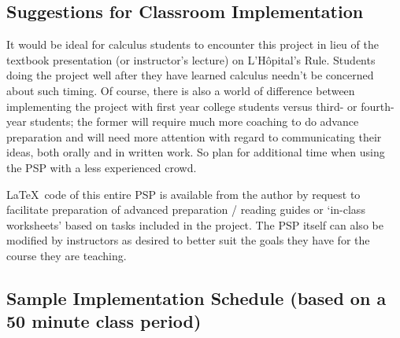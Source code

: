\documentclass[11pt]{article}
\begin{document}
  \vspace*{-6pt}
\subsection*{Suggestions for Classroom Implementation}
  \vspace*{-3pt}

It would be ideal for calculus students to encounter this project in lieu of the textbook presentation (or instructor's lecture) on L'H\^opital's Rule. Students doing the project well after they have learned calculus needn't be concerned about such timing. Of course, there is also a world of difference between implementing the project with first year college students versus third- or fourth-year students; the former will require much more coaching to do advance preparation and will need more attention with regard to communicating their ideas, both orally and in written work. So plan for additional time when using the PSP with a less experienced crowd.


\LaTeX \, code of this entire PSP is available from the author by request to facilitate preparation of  advanced preparation / reading guides or  `in-class worksheets' based on tasks included in the project.   The PSP itself can also be modified by  instructors as desired to better suit the  goals they have for the  course they are teaching.




  \vspace*{-6pt}
\subsection*{Sample Implementation Schedule (based on a 50 minute class period)}%
  \vspace*{-3pt}
\end{document}
